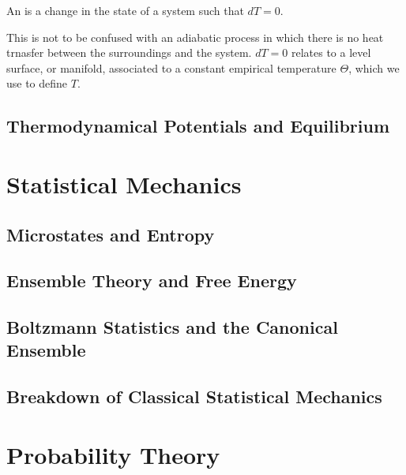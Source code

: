 \documentclass[12pt, a4paper, oneside, openright, titlepage]{book}
\begin{document}
\begin{defn}
    An  is a change in the state of a system such that $dT = 0$.
\end{defn}

This is not to be confused with an adiabatic process in which there is no heat trnasfer between the surroundings and the system. $dT = 0$ relates to a level surface, or manifold, associated to a constant empirical temperature $\Theta$, which we use to define $T$.





\chapter{Thermodynamical Potentials and Equilibrium}




\part{Statistical Mechanics}


\chapter{Microstates and Entropy}



\chapter{Ensemble Theory and Free Energy}



\chapter{Boltzmann Statistics and the Canonical Ensemble}



\chapter{Breakdown of Classical Statistical Mechanics}



\part{Probability Theory}
\end{document}
